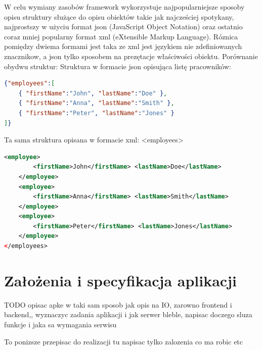 \documentclass[12pt]{report}
\begin{document}
W celu wymiany zasobów framework wykorzystuje najpopularniejsze sposoby opisu struktury służące do opisu obiektów takie jak najcześciej spotykany, najprostszy w użyciu format json (JavaScript Object Notation) oraz ostatnio coraz mniej popularny format xml (eXtensible Markup Language). 
Róznica pomiędzy dwiema formami jest taka ze xml jest językiem nie zdefiniowanych znacznikow, a json tylko sposobem na prezętacje właściwości obiektu. 
Porównanie obydwu struktur:
Struktura w formacie json opisująca listę pracowników:
\begin{lstlisting}[language=json,firstnumber=1]
{"employees":[
	{ "firstName":"John", "lastName":"Doe" },
	{ "firstName":"Anna", "lastName":"Smith" },
	{ "firstName":"Peter", "lastName":"Jones" }
]}
\end{lstlisting}

Ta sama struktura opisana w formacie xml:
<employees>
\begin{lstlisting}[language=XML,firstnumber=1]
	<employee>
		<firstName>John</firstName> <lastName>Doe</lastName>
	</employee>
	<employee>
		<firstName>Anna</firstName> <lastName>Smith</lastName>
	</employee>
	<employee>
		<firstName>Peter</firstName> <lastName>Jones</lastName>
	</employee>
</employees>
\end{lstlisting}

\chapter{Założenia i specyfikacja aplikacji} 
TODO opisac apke w taki sam sposob jak opis na IO, zarowno frontend i backend,, wyznaczyc zadania aplikacji i jak serwer bleble, napisac doczego sluza funkcje i jaka sa wymagania serwisu

To ponizsze przepisac do realizacji tu napisac tylko zalozenia co ma robic etc
\end{document}
